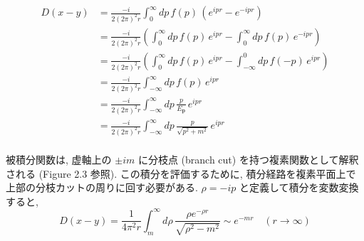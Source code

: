 \documentclass[a4paper,12pt]{article}
\begin{document}
\begin{align*}
  D(x - y) &= \frac{-i}{2(2\pi)^2 r} \int_{0}^{\infty} dp\, f(p)\, (e^{ipr} - e^{-ipr}) \tag{2-4.f7}\\
  &= \frac{-i}{2(2\pi)^2 r} \left(  \int_{0}^{\infty} dp\, f(p)\,e^{ipr} - \int_{0}^{\infty} dp\, f(p)\,e^{-ipr} \right) \tag{2-4.f8}\\
  &= \frac{-i}{2(2\pi)^2 r} \left(  \int_{0}^{\infty} dp\, f(p)\,e^{ipr} - \int_{-\infty}^{0} dp\, f(-p)\,e^{ipr} \right) \tag{2-4.f9}\\
  &= \frac{-i}{2(2\pi)^2 r} \int_{-\infty}^{\infty} dp\, f(p)\,e^{ipr} \tag{2-4.f10}\\
  &= \frac{-i}{2(2\pi)^2 r} \int_{-\infty}^{\infty} dp\, \frac{p}{E_{\mathbf{p}}}\,e^{ipr} \tag{2-4.f11}\\
  &= \frac{-i}{2(2\pi)^2 r} \int_{-\infty}^{\infty} dp\, \frac{p}{\sqrt{p^2 + m^2}}\,e^{ipr} \tag{2-4.f12}\\
\end{align*}

\color{black}
被積分関数は, 虚軸上の $\pm im$ に分枝点 (branch cut) を持つ複素関数として解釈される (Figure 2.3 参照). この積分を評価するために, 積分経路を複素平面上で上部の分枝カットの周りに回す必要がある. $\rho = -ip$ と定義して積分を変数変換すると,
\begin{equation*}
D(x - y) = \frac{1}{4\pi^2 r} \int_m^\infty d\rho \, \frac{\rho e^{-\rho r}}{\sqrt{\rho^2 - m^2}} \sim e^{-mr}\quad(r \to \infty) \label{2.52}\tag{2.52}
\end{equation*}
\end{document}
